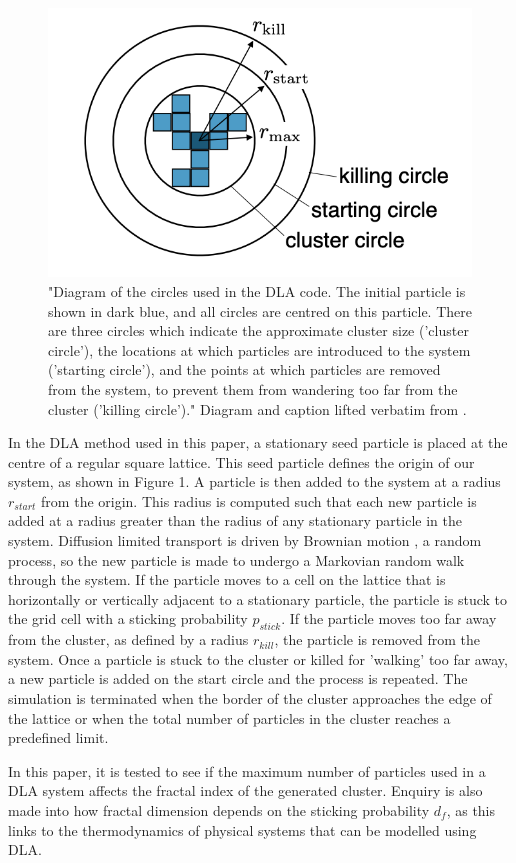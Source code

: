 \documentclass[11pt]{iopart}
\begin{document}
\begin{figure}[b]
  \centering
  \includegraphics[width=0.5\linewidth]{images/circles.png}
  \caption{"Diagram of the circles used in the DLA code. The initial particle is shown in dark blue, and all circles are centred on this particle. There are three circles which indicate the approximate cluster size ('cluster circle'), the locations at which particles are introduced to the system ('starting circle'), and the points at which particles are removed from the system, to prevent them from wandering too far from the cluster ('killing circle')." Diagram and caption lifted verbatim from \cite{handout}.}
  \label{fig:circles}
\end{figure}

In the DLA method used in this paper, a stationary seed particle is placed at the centre of a regular square lattice. This seed particle defines the origin of our system, as shown in Figure 1. A particle is then added to the system at a radius $r_{start}$ from the origin. This radius is computed such that each new particle is added at a radius greater than the radius of any stationary particle in the system. Diffusion limited transport is driven by Brownian motion \cite{brownian}, a random process, so the new particle is made to undergo a Markovian random walk through the system. If the particle moves to a cell on the lattice that is horizontally or vertically adjacent to a stationary particle, the particle is stuck to the grid cell with a sticking probability $p_{stick}$. If the particle moves too far away from the cluster, as defined by a radius $r_{kill}$, the particle is removed from the system. Once a particle is stuck to the cluster or killed for 'walking' too far away, a new particle is added on the start circle and the process is repeated. The simulation is terminated when the border of the cluster approaches the edge of the lattice or when the total number of particles in the cluster reaches a predefined limit.

In this paper, it is tested to see if the maximum number of particles used in a DLA system affects the fractal index of the generated cluster. Enquiry is also made into how fractal dimension depends on the sticking probability $d_f$, as this links to the thermodynamics of physical systems that can be modelled using DLA.
\end{document}
